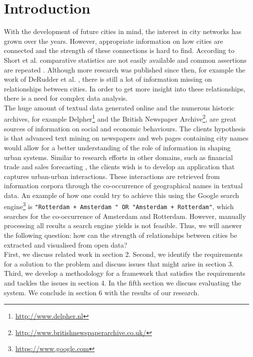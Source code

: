 \section{Introduction}
With the development of future cities in mind, the interest in city networks has grown over the years. However, appropriate information on how cities are connected and the strength of these connections is hard to find. According to Short et al. comparative statistics are not easily available and common assertions are repeated \cite{short1996dirty}. Although more research was published since then, for example the work of DeRudder et al. \cite{derudder2005appraisal}, there is still a lot of information missing on relationships between cities.
 In order to get more insight into these relationships, there is a need for complex data analysis. \\

The huge amount of textual data generated online and the numerous historic archives, for example Delpher\footnote{\url{http://www.delpher.nl}} and the British Newspaper Archive\footnote{\url{http://www.britishnewspaperarchive.co.uk/}}, are great sources of information on social and economic behaviours. The clients hypothesis is that advanced text mining on newspapers and web pages containing city names would allow for a better understanding of the role of information in shaping urban systems. Similar to research efforts in other domains, such as financial trade \cite{preis2013quantifying} and sales forecasting \cite{wu2014future}, the clients wish is to develop an application that captures urban-urban interactions. These interactions are retrieved from information corpora through the co-occurrence of geographical names in textual data. An example of how one could try to achieve this using  the Google search engine\footnote{\url{https://www.google.com}} is \texttt{"Rotterdam + Amsterdam " OR "Amsterdam + Rotterdam"}, which searches for the co-occurrence of Amsterdam and Rotterdam. However, manually processing all results a search engine yields is not feasible. Thus, we will answer the following question: 
how can the strength of relationships between cities be extracted and visualised from open data? \\

First, we discuss related work in section 2. Second, we identify the requirements for a solution to the problem and discuss issues that might arise in section 3. Third, we develop a methodology for a framework that satisfies the requirements and tackles the issues in section 4. In the fifth section we discuss evaluating the system. We conclude in section 6 with the results of our research.